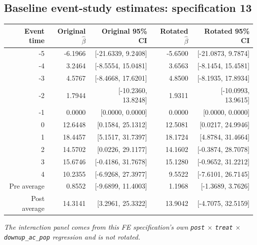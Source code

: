 \documentclass[10pt]{article}
\begin{document}
\subsection*{Baseline event-study estimates: specification 13}
\begin{center}
\scriptsize
\begin{tabular}{r rr rr}
\toprule
Event time & Original $\hat\beta$ & Original 95\% CI & Rotated $\hat\beta$ & Rotated 95\% CI \\
\midrule
-5 & -6.1966 & [-21.6339, 9.2408] & -5.6500 & [-21.0873, 9.7874] \\
-4 & 3.2464 & [-8.5554, 15.0481] & 3.6563 & [-8.1454, 15.4581] \\
-3 & 4.5767 & [-8.4668, 17.6201] & 4.8500 & [-8.1935, 17.8934] \\
-2 & 1.7944 & [-10.2360, 13.8248] & 1.9311 & [-10.0993, 13.9615] \\
-1 & 0.0000 & [0.0000, 0.0000] & 0.0000 & [0.0000, 0.0000] \\
0 & 12.6448 & [0.1584, 25.1312] & 12.5081 & [0.0217, 24.9946] \\
1 & 18.4457 & [5.1517, 31.7397] & 18.1724 & [4.8784, 31.4664] \\
2 & 14.5702 & [0.0226, 29.1177] & 14.1602 & [-0.3874, 28.7078] \\
3 & 15.6746 & [-0.4186, 31.7678] & 15.1280 & [-0.9652, 31.2212] \\
4 & 10.2355 & [-6.9268, 27.3977] & 9.5522 & [-7.6101, 26.7145] \\
\midrule
Pre average & 0.8552 & [-9.6899, 11.4003] & 1.1968 & [-1.3689, 3.7626] \\
Post average & 14.3141 & [3.2961, 25.3322] & 13.9042 & [-4.7075, 32.5159] \\
\bottomrule
\end{tabular}
\end{center}
\medskip
\textit{The interaction panel comes from this FE specification's own \texttt{post} $\times$ \texttt{treat} $\times$ \texttt{downup\_ac\_pop} regression and is not rotated.}
\clearpage
\end{document}
